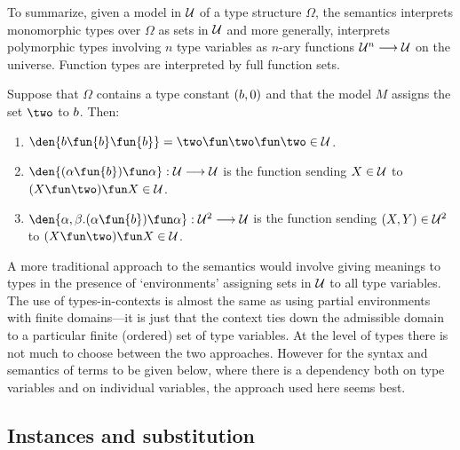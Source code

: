 To summarize, given a model in $\cal U$ of a type structure $\Omega$,
the semantics interprets monomorphic types over $\Omega$ as sets in
$\cal U$ and more generally, interprets polymorphic types involving $n$ type variables as $n$-ary functions ${\cal
U}^{n}\longrightarrow{\cal U}$ on the universe.  Function types are
interpreted by full function sets.

\medskip

Suppose that $\Omega$ contains a type constant $({\sl b},0)$ and that
the model $M$ assigns the set $\two$ to $\sl b$. Then:
\begin{enumerate}
 
\item $\den{{\sl b}\fun{\sl b}\fun{\sl b}}=\two\fun\two\fun\two\in{\cal U}$.

\item $\den{(\alpha\fun{\sl b})\fun\alpha}:{\cal U}\longrightarrow{\cal U}$
is the function sending $X\in{\cal U}$ to $(X\fun\two)\fun X\in{\cal U}$.

\item $\den{\alpha,\beta . (\alpha\fun{\sl b})\fun\alpha}:{\cal
U}^{2}\longrightarrow{\cal U}$ is the function sending $(X,Y)\in{\cal
U}^{2}$ to $(X\fun\two)\fun X\in{\cal U}$.

\end{enumerate}

\medskip

A more traditional approach to the semantics would involve giving
meanings to types in the presence of `environments' assigning sets in
$\cal U$ to all type variables. The use of types-in-contexts is almost
the same as using partial environments with finite domains---it is
just that the context ties down the admissible domain to a particular
finite (ordered) set of type variables. At the level of types there is
not much to choose between the two approaches.  However for the syntax
and semantics of terms to be given below, where there is a dependency
both on type variables and on individual variables, the approach used
here seems best.

\subsection{Instances and substitution}
\label{instances-and-substitution}

